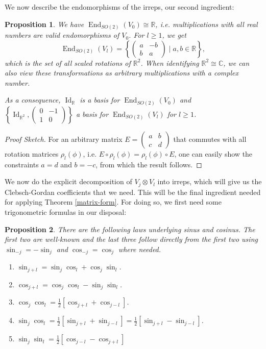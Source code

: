\documentclass[12pt, a4paper]{article}
\theoremstyle{plain}
\newtheorem{pro}{Proposition}[section]
\theoremstyle{definition}
\theoremstyle{remark}
\newcommand{\R}{\mathds{R}}
\newcommand{\C}{\mathds{C}}
\DeclareMathOperator{\End}{End}
\DeclareMathOperator{\Id}{Id}
\begin{document}
We now describe the endomorphisms of the irreps, our second ingredient:

\begin{pro}\label{endomorphisms}
We have $\End_{SO(2)}(V_0) \cong \R$, i.e. multiplications with all real numbers are valid endomorphisms of $V_0$. For $l \geq 1$, we get
\begin{equation*}
\End_{SO(2)}(V_l) = \left\lbrace \begin{pmatrix} a & -b \\ b & a \end{pmatrix} \mid a, b \in \R \right\rbrace,
\end{equation*}
which is the set of all scaled rotations of $\R^2$. When identifying $\R^2 \cong \C$, we can also view these transformations as arbitrary multiplications with a complex number.

As a consequence, $\Id_\R$ is a basis for $\End_{SO(2)}(V_0)$ and $\left\lbrace\Id_{\R^2}, \begin{pmatrix}0 & -1 \\ 1 & 0 \end{pmatrix}\right\rbrace$ a basis for $\End_{SO(2)}(V_l)$ for $l \geq 1$.
\end{pro}

\begin{proof}[Proof Sketch]
For an arbitrary matrix $E = \begin{pmatrix} a & b \\ c & d\end{pmatrix}$ that commutes with all rotation matrices $\rho_l(\phi)$, i.e. $E \circ \rho_l(\phi) = \rho_l(\phi) \circ E$, one can easily show the constraints $a = d$ and $b = -c$, from which the result follows. 
\end{proof}

We now do the explicit decomposition of $V_j \otimes V_l$ into irreps, which will give us the Clebsch-Gordan coefficients that we need. This will be the final ingredient needed for applying Theorem \ref{matrix-form}. For doing so, we first need some trigonometric formulas in our disposal:

\begin{pro}\label{trigonometric formulas}
There are the following laws underlying sinus and cosinus. The first two are well-known and the last three follow directly from the first two using $\sin_{-j} = - \sin_j$ and $\cos_{-j} = \cos_j$ where needed.
\begin{enumerate}
\item $\sin_{j+l} = \sin_j \cos_l + \cos_j \sin_l$.
\item $\cos_{j+l} = \cos_j\cos_l - \sin_j \sin_l$.
\item $\cos_j \cos_l = \frac{1}{2} \left[ \cos_{j+l} + \cos_{j-l} \right]$.
\item $\sin_j \cos_l = \frac{1}{2} \left[  \sin_{j+l} + \sin_{j-l} \right] = \frac{1}{2} \left[ \sin_{j+l} - \sin_{j - l}\right]$.
\item $\sin_j \sin_l = \frac{1}{2} \left[ \cos_{j-l} - \cos_{j+l} \right]$
\end{enumerate}
\end{pro}
\end{document}
